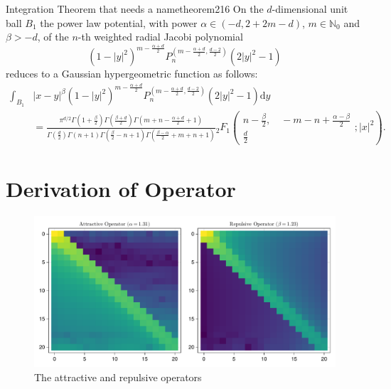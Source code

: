 \begin{theorem}{Integration Theorem that needs a name}{theorem216}
  On the $d$-dimensional unit ball $B_1$ the power law potential, with power $\alpha \in(-d,2+2m-d)$, $m\in\mathbb{N}_0$ and $\beta>-d$, of the $n$-th weighted radial Jacobi polynomial $$(1-|y|^2)^{m-\frac{\alpha+d}{2}}P_n^{(m-\frac{\alpha+d}{2},\frac{d-2}{2})}(2|y|^2-1)$$ reduces to a Gaussian hypergeometric function as follows:
  \begin{align*}
    \int_{B_1} & |x-y|^\beta (1-|y|^2)^{m-\frac{\alpha+d}{2}} P_n^{(m-\frac{\alpha+d}{2},\frac{d-2}{2})}(2|y|^2-1) \mathrm{d}y                                                                                                                                                                                                                                                                                               \\
               & = \tfrac{\pi ^{d/2} \Gamma \left(1+\frac{\beta}{2}\right) \Gamma \left(\frac{\beta+d}{2}\right) \Gamma \left(m+n-\frac{\alpha+d}{2}+1\right)}{\Gamma \left(\frac{d}{2}\right) \Gamma (n+1) \Gamma \left(\frac{\beta}{2}-n+1\right) \Gamma \left(\frac{\beta-\alpha}{2}+m+n+1\right)}{}_2F_1\left(\begin{matrix}n-\frac{\beta}{2}, \quad -m-n+\frac{\alpha-\beta}{2} \\\frac{d}{2}\end{matrix};|x|^2\right).
  \end{align*}
\end{theorem}

\section{Derivation of Operator}


\begin{figure}[H]
  \centering
  \label{fig:attractive-repulsive}
  \includegraphics[width=\linewidth]{../figures/results/attractive-repulsive-operator.pdf}
  \caption{The attractive and repulsive operators}
\end{figure}
